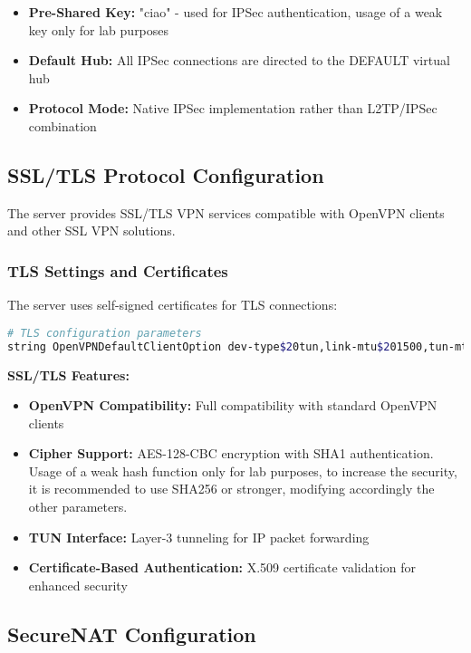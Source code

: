 \begin{itemize}
    \item \textbf{Pre-Shared Key:} "ciao" - used for IPSec authentication, usage of a weak key only for lab purposes
    \item \textbf{Default Hub:} All IPSec connections are directed to the DEFAULT virtual hub
    \item \textbf{Protocol Mode:} Native IPSec implementation rather than L2TP/IPSec combination
\end{itemize}

\subsection{SSL/TLS Protocol Configuration}

The server provides SSL/TLS VPN services compatible with OpenVPN clients and other SSL VPN solutions.

\subsubsection{TLS Settings and Certificates}

The server uses self-signed certificates for TLS connections:

\begin{lstlisting}[language=bash]
# TLS configuration parameters
string OpenVPNDefaultClientOption dev-type$20tun,link-mtu$201500,tun-mtu$201500,cipher$20AES-128-CBC,auth$20SHA1,keysize$20128,key-method$202,tls-client
\end{lstlisting}

\noindent
\textbf{SSL/TLS Features:}

\begin{itemize}
    \item \textbf{OpenVPN Compatibility:} Full compatibility with standard OpenVPN clients
    \item \textbf{Cipher Support:} AES-128-CBC encryption with SHA1 authentication. Usage of a weak hash function only for lab purposes, to increase the security, it is recommended to use SHA256 or stronger, modifying accordingly the other parameters.
    \item \textbf{TUN Interface:} Layer-3 tunneling for IP packet forwarding
    \item \textbf{Certificate-Based Authentication:} X.509 certificate validation for enhanced security
\end{itemize}

\subsection{SecureNAT Configuration}


